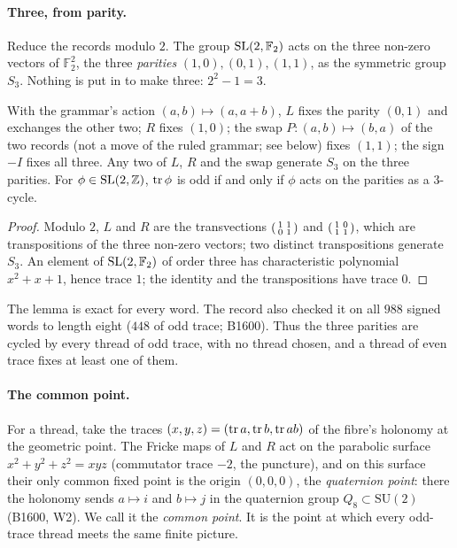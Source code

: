 \paragraph{Three, from parity.}
Reduce the records modulo $2$. The group $\mathrm{SL}(2,\mathbb{F}_2)$ acts on the three non-zero vectors of $\mathbb{F}_2^2$, the
three \emph{parities} $(1,0),(0,1),(1,1)$, as the symmetric group $S_3$. Nothing is put in to make three: $2^2-1=3$.

\begin{lemma}\label{lem:parity}
With the grammar's action $(a,b)\mapsto(a,a+b)$, $L$ fixes the parity $(0,1)$ and exchanges the other two; $R$
fixes $(1,0)$; the swap $P:(a,b)\mapsto(b,a)$ of the two records (not a move of
the ruled grammar; see below) fixes $(1,1)$; the sign $-I$ fixes all three. Any two of $L$, $R$ and the swap generate $S_3$ on the three
parities. For $\phi\in\mathrm{SL}(2,\mathbb{Z})$, $\operatorname{tr}\phi$ is odd if and only if $\phi$ acts on the parities as a $3$-cycle.
\end{lemma}
\begin{proof}
Modulo $2$, $L$ and $R$ are the transvections $\begin{psmallmatrix}1&1\\0&1\end{psmallmatrix}$ and $\begin{psmallmatrix}1&0\\1&1\end{psmallmatrix}$, which are transpositions of the three
non-zero vectors; two distinct transpositions generate $S_3$. An element of $\mathrm{SL}(2,\mathbb{F}_2)$ of order three has
characteristic polynomial $x^2+x+1$, hence trace $1$; the identity and the transpositions have trace $0$.
\end{proof}

The lemma is exact for every word. The record also checked it on all $988$ signed words to length eight ($448$ of odd
trace; B1600). Thus the three parities are cycled by every thread of odd trace, with no thread chosen, and a thread of
even trace fixes at least one of them.

\paragraph{The common point.}
For a thread, take the traces $(x,y,z)=(\operatorname{tr} a,\operatorname{tr} b,\operatorname{tr} ab)$ of the fibre's holonomy at the geometric point. The
Fricke maps of $L$ and $R$ act on the parabolic surface $x^2+y^2+z^2=xyz$ (commutator trace $-2$, the puncture), and on this
surface their only common fixed point is the origin $(0,0,0)$, the \emph{quaternion point}: there the holonomy sends
$a\mapsto i$ and $b\mapsto j$ in the quaternion group $Q_8\subset\mathrm{SU}(2)$ (B1600, W2). We call it the
\emph{common point}. It is the point at which every odd-trace thread meets the same finite picture.

